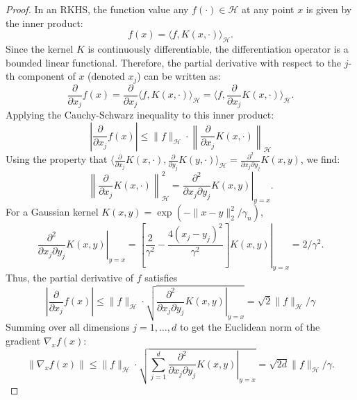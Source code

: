\begin{proof}
    In an RKHS, the function value any $f(\cdot)\in \mathcal{H}$ at any point $x$ is given by the inner product:$$f(x) = \langle f, K(x, \cdot) \rangle_{\mathcal{H}}.$$ 
    Since the kernel $K$ is continuously differentiable, the differentiation operator is a bounded linear functional. Therefore, the partial derivative with respect to the $j$-th component of $x$ (denoted $x_j$) can be written as:$$\frac{\partial}{\partial x_j} f(x) = \frac{\partial}{\partial x_j} \langle f, K(x, \cdot) \rangle_{\mathcal{H}} = \langle f, \frac{\partial}{\partial x_j} K(x, \cdot) \rangle_{\mathcal{H}}.$$
    Applying the Cauchy-Schwarz inequality to this inner product:$$\left| \frac{\partial}{\partial x_j} f(x) \right| \leq \|f\|_{\mathcal{H}} \cdot \left\| \frac{\partial}{\partial x_j} K(x, \cdot) \right\|_{\mathcal{H}}$$
    Using the property that $\langle \frac{\partial}{\partial x_j} K(x, \cdot), \frac{\partial}{\partial y_j} K(y, \cdot) \rangle_{\mathcal{H}} = \frac{\partial^2}{\partial x_j \partial y_j} K(x, y)$, we find:$$\left\| \frac{\partial}{\partial x_j} K(x, \cdot) \right\|_{\mathcal{H}}^2 = \left. \frac{\partial^2}{\partial x_j \partial y_j} K(x, y) \right|_{y=x}.$$ 
    For a Gaussian kernel $K(x,y) = \exp(-\|x-y\|_2^2/\gamma_n)$,
    $$\left. \frac{\partial^2}{\partial x_j \partial y_j} K(x, y) \right|_{y=x}  = \left.\left[ \frac{2}{\gamma^2} - \frac{4(x_j - y_j)^2}{\gamma^2} \right] K(x, y) \right|_{y=x} =  2/\gamma^2.$$
    Thus, the partial derivative of $f$ satisfies
    $$\left| \frac{\partial}{\partial x_j} f(x) \right| \leq \|f\|_{\mathcal{H}} \cdot \sqrt{\left. \frac{\partial^2}{\partial x_j \partial y_j} K(x, y) \right|_{y=x}} = \sqrt{2}\|f\|_{\mathcal{H}}/\gamma$$
    Summing over all dimensions $j=1, \dots, d$ to get the Euclidean norm of the gradient $\nabla_x f(x)$:$$\|\nabla_x f(x)\| \leq \|f\|_{\mathcal{H}} \cdot \sqrt{\sum_{j=1}^d \left. \frac{\partial^2}{\partial x_j \partial y_j} K(x, y) \right|_{y=x}} = \sqrt{2d}\|f\|_{\mathcal{H}}/\gamma.$$
    
    
    
    
\end{proof}

